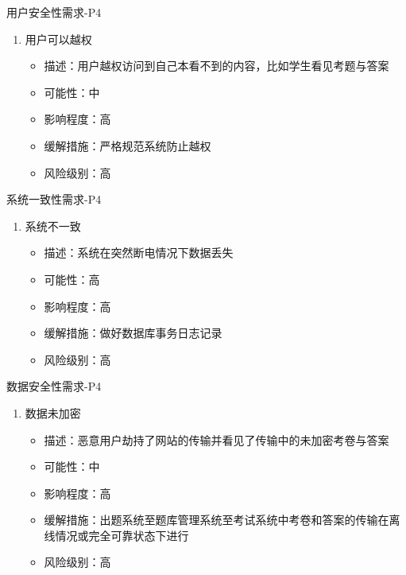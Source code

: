 \documentclass[hyperref, a4paper]{ctexart}
\providecommand{\tightlist}{%
  \setlength{\itemsep}{0pt}\setlength{\parskip}{0pt}}
\begin{document}
用户安全性需求-P4

\begin{enumerate}
\def\labelenumi{\arabic{enumi}.}
\tightlist
\item
  用户可以越权

  \begin{itemize}
  \tightlist
  \item
    描述：用户越权访问到自己本看不到的内容，比如学生看见考题与答案
  \item
    可能性：中
  \item
    影响程度：高
  \item
    缓解措施：严格规范系统防止越权
  \item
    风险级别：高
  \end{itemize}
\end{enumerate}

系统一致性需求-P4

\begin{enumerate}
\def\labelenumi{\arabic{enumi}.}
\tightlist
\item
  系统不一致

  \begin{itemize}
  \tightlist
  \item
    描述：系统在突然断电情况下数据丢失
  \item
    可能性：高
  \item
    影响程度：高
  \item
    缓解措施：做好数据库事务日志记录
  \item
    风险级别：高
  \end{itemize}
\end{enumerate}

数据安全性需求-P4

\begin{enumerate}
\def\labelenumi{\arabic{enumi}.}
\tightlist
\item
  数据未加密

  \begin{itemize}
  \tightlist
  \item
    描述：恶意用户劫持了网站的传输并看见了传输中的未加密考卷与答案
  \item
    可能性：中
  \item
    影响程度：高
  \item
    缓解措施：出题系统至题库管理系统至考试系统中考卷和答案的传输在离线情况或完全可靠状态下进行
  \item
    风险级别：高
  \end{itemize}
\end{enumerate}
\end{document}
